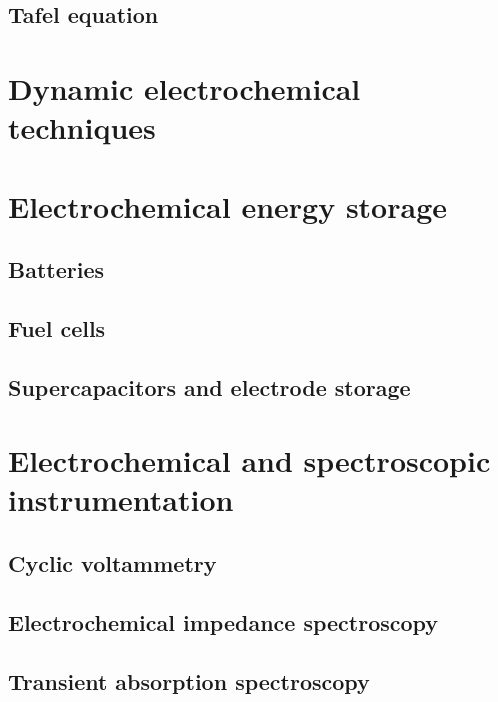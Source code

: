 \documentclass{article}
\numberwithin{theorem}{section}
\numberwithin{corollary}{section}
\numberwithin{postulate}{section}
\numberwithin{lemma}{section}
\numberwithin{definition}{section}
\begin{document}
\subsection{Tafel equation}

\section{Dynamic electrochemical techniques}

\section{Electrochemical energy storage}

\subsection{Batteries}

\subsection{Fuel cells}

\subsection{Supercapacitors and electrode storage}

\section{Electrochemical and spectroscopic instrumentation}

\subsection{Cyclic voltammetry}

\subsection{Electrochemical impedance spectroscopy}

\subsection{Transient absorption spectroscopy}
\end{document}
